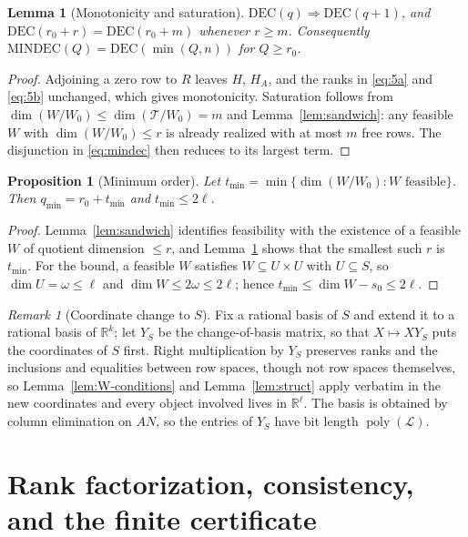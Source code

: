 \documentclass[journal]{IEEEtran}
\theoremstyle{plainn}
\newtheorem{lem}[thm]{Lemma}
\newtheorem{prop}[thm]{Proposition}
\theoremstyle{remark}
\newtheorem{remark}{Remark}
\begin{document}
\begin{lem}[Monotonicity and saturation]\label{lem:monotone}
$\mathrm{DEC}(q)\Rightarrow\mathrm{DEC}(q+1)$, and $\mathrm{DEC}(r_0+r)=\mathrm{DEC}(r_0+m)$
whenever $r\ge m$. Consequently $\mathrm{MINDEC}(Q)=\mathrm{DEC}(\min(Q,n))$ for
$Q\ge r_0$.
\end{lem}

\begin{proof}
Adjoining a zero row to $R$ leaves $H$, $H_A$, and the ranks in \eqref{eq:5a} and
\eqref{eq:5b} unchanged, which gives monotonicity. Saturation follows from
$\dim(W/W_0)\le\dim(\mathcal T/W_0)=m$ and Lemma~\ref{lem:sandwich}: any feasible $W$ with
$\dim(W/W_0)\le r$ is already realized with at most $m$ free rows. The disjunction in
\eqref{eq:mindec} then reduces to its largest term.
\end{proof}

\begin{prop}[Minimum order]\label{prop:minorder}
Let $t_{\min}=\min\{\dim(W/W_0):W \text{ feasible}\}$. Then
$q_{\min}=r_0+t_{\min}$ and $t_{\min}\le2\ell$.
\end{prop}

\begin{proof}
Lemma~\ref{lem:sandwich} identifies feasibility with the existence of a feasible $W$ of
quotient dimension $\le r$, and Lemma~\ref{lem:monotone} shows that the smallest such $r$ is
$t_{\min}$. For the bound, a feasible $W$ satisfies $W\subseteq U\times U$ with
$U\subseteq S$, so $\dim U=\omega\le\ell$ and $\dim W\le2\omega\le2\ell$; hence
$t_{\min}\le\dim W-s_0\le2\ell$.
\end{proof}

\begin{remark}[Coordinate change to $S$]\label{rem:YS}
Fix a rational basis of $S$ and extend it to a rational basis of $\mathbb R^k$; let $Y_S$ be
the change-of-basis matrix, so that $X\mapsto XY_S$ puts the coordinates of $S$ first. Right
multiplication by $Y_S$ preserves ranks and the inclusions and equalities between row spaces,
though not row spaces themselves, so Lemma~\ref{lem:W-conditions} and
Lemma~\ref{lem:struct} apply verbatim in the new coordinates and every object involved lives
in $\mathbb R^\ell$. The basis is obtained by column elimination on $AN$, so the entries of
$Y_S$ have bit length $\operatorname{poly}(\mathcal L)$.
\end{remark}

\section{Rank factorization, consistency, and the finite certificate}\label{sec:certificate}
\end{document}
